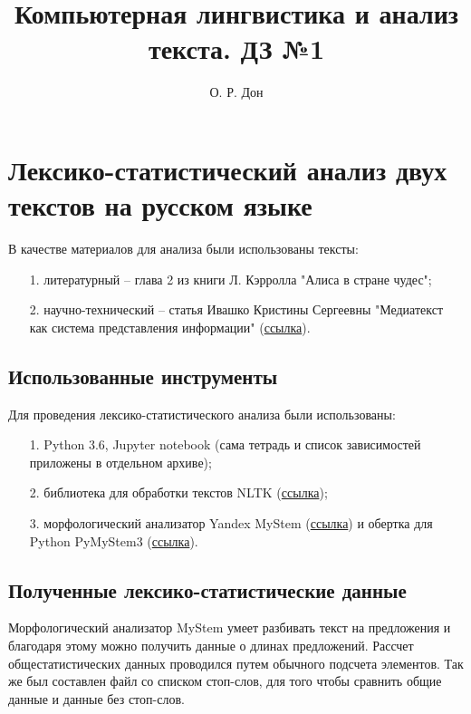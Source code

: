 \documentclass[12pt]{article}
\begin{document}
\title{Компьютерная лингвистика и анализ текста. ДЗ №1}
\author{О. Р. Дон}
\maketitle

\section*{Лексико-статистический анализ двух текстов на русском языке}

В качестве материалов для анализа были использованы тексты:
\begin{itemize}
\item[1.] литературный -- глава 2 из книги Л. Кэрролла "Алиса в стране чудес";
\item[2.] научно-технический -- статья Ивашко Кристины Сергеевны "Медиатекст как система представления информации" (\href{http://sci-article.ru/stat.php?i=1579679587}{ссылка}).
\end{itemize}

\subsection*{Использованные инструменты}

Для проведения лексико-статистического анализа были использованы:
\begin{itemize}
\item[1.] Python 3.6, Jupyter notebook (сама тетрадь и список зависимостей приложены в отдельном архиве);
\item[2.] библиотека для обработки текстов NLTK (\href{https://www.nltk.org/}{ссылка});
\item[3.] морфологический анализатор Yandex MyStem (\href{https://yandex.ru/dev/mystem/}{ссылка}) и обертка для Python PyMyStem3 (\href{https://github.com/nlpub/pymystem3}{ссылка}).
\end{itemize}

\subsection*{Полученные лексико-статистические данные}

Морфологический анализатор MyStem умеет разбивать текст на предложения и благодаря этому можно получить данные о длинах предложений. Рассчет общестатистических данных проводился путем обычного подсчета элементов. Так же был составлен файл со списком стоп-слов, для того чтобы сравнить общие данные и данные без стоп-слов.
\end{document}
